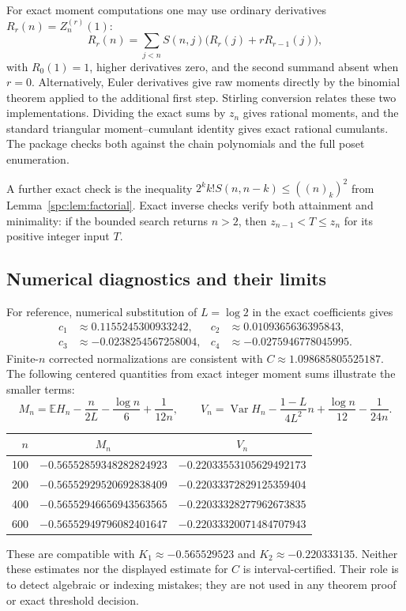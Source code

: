 \documentclass[11pt,letterpaper]{article}
\theoremstyle{definition}\newtheorem{definition}[theorem]{Definition}
\theoremstyle{remark}\newtheorem{remark}[theorem]{Remark}
\newcommand{\E}{\mathbb E}
\newcommand{\Var}{\operatorname{Var}}
\newcommand{\fall}[2]{(#1)_{#2}}
\begin{document}
For exact moment computations one may use ordinary derivatives $R_r(n)=Z_n^{(r)}(1)$:
\begin{equation}\label{spc:eq:derivrec}
 R_r(n)=\sum_{j<n}S(n,j)\bigl(R_r(j)+rR_{r-1}(j)\bigr),
\end{equation}
with $R_0(1)=1$, higher derivatives zero, and the second summand absent when $r=0$. Alternatively, Euler derivatives give raw moments directly by the binomial theorem applied to the additional first step. Stirling conversion relates these two implementations. Dividing the exact sums by $z_n$ gives rational moments, and the standard triangular moment--cumulant identity gives exact rational cumulants. The package checks both against the chain polynomials and the full poset enumeration.

A further exact check is the inequality $2^kk!S(n,n-k)\le(\fall nk)^2$ from Lemma~\ref{spc:lem:factorial}. Exact inverse checks verify both attainment and minimality: if the bounded search returns $n>2$, then $z_{n-1}<T\le z_n$ for its positive integer input $T$.

\subsection{Numerical diagnostics and their limits}
For reference, numerical substitution of $L=\log2$ in the exact coefficients gives
\[
 \begin{aligned}
 c_1&\approx 0.1155245300933242,& c_2&\approx 0.0109365636395843,\\
 c_3&\approx-0.0238254567258004,& c_4&\approx-0.0275946778045995.
 \end{aligned}
\]
Finite-$n$ corrected normalizations are consistent with
$C\approx1.098685805525187$. The following centered quantities from exact integer moment sums illustrate the smaller terms:
\[
 M_n=\E H_n-\frac n{2L}-\frac{\log n}{6}+\frac1{12n},\qquad
 V_n=\Var H_n-\frac{1-L}{4L^2}n+\frac{\log n}{12}-\frac1{24n}.
\]
\begin{center}
\begin{tabular}{rcc}
\toprule
$n$ & $M_n$ & $V_n$\\
\midrule
100 & $-0.56552859348282824923$ & $-0.22033553105629492173$\\
200 & $-0.56552929520692838409$ & $-0.22033372829125359404$\\
400 & $-0.56552946656943563565$ & $-0.22033328277962673835$\\
600 & $-0.56552949796082401647$ & $-0.22033320071484707943$\\
\bottomrule
\end{tabular}
\end{center}
These are compatible with $K_1\approx-0.565529523$ and $K_2\approx-0.220333135$. Neither these estimates nor the displayed estimate for $C$ is interval-certified. Their role is to detect algebraic or indexing mistakes; they are not used in any theorem proof or exact threshold decision.
\end{document}
